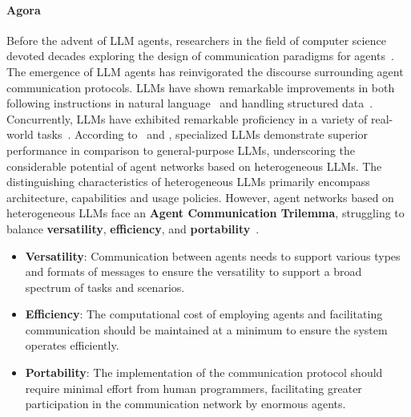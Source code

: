 \documentclass[10pt,preprint]{article}
\begin{document}
\paragraph{Agora~\citep{marro2024scalablecommunicationprotocolnetworks}} Before the advent of LLM agents, researchers in the field of computer science devoted decades exploring the design of communication paradigms for agents~\citep{gilbert2019agent}. The emergence of LLM agents has reinvigorated the discourse surrounding agent communication protocols. LLMs have shown remarkable improvements in both following instructions in natural language~\citep{wei2022chain} and handling structured data~\citep{collins2022structuredflexiblerobustbenchmarking}. Concurrently, LLMs have exhibited remarkable proficiency in a variety of real-world tasks~\citep{pyatkin2022reinforced,zhong2023study,wei2022chain}. According to~\cite{hu2022lora} and \cite{marro2024scalablecommunicationprotocolnetworks}, specialized LLMs demonstrate superior performance in comparison to general-purpose LLMs, underscoring the considerable potential of agent networks based on heterogeneous LLMs. The distinguishing characteristics of heterogeneous LLMs primarily encompass architecture, capabilities and usage policies. However, agent networks based on heterogeneous LLMs face an \textbf{Agent Communication Trilemma}, struggling to balance \textbf{versatility}, \textbf{efficiency}, and \textbf{portability}~\citep{marro2024scalablecommunicationprotocolnetworks}.



\begin{itemize}
    \item \textbf{Versatility}: Communication between agents needs to support various types and formats of messages to ensure the versatility to support a broad spectrum of tasks and scenarios.
    \item \textbf{Efficiency}: The computational cost of employing agents and facilitating communication should be maintained at a minimum to ensure the system operates efficiently.
    \item \textbf{Portability}: The implementation of the communication protocol should require minimal effort from human programmers, facilitating greater participation in the communication network by enormous agents.
\end{itemize}
\end{document}
